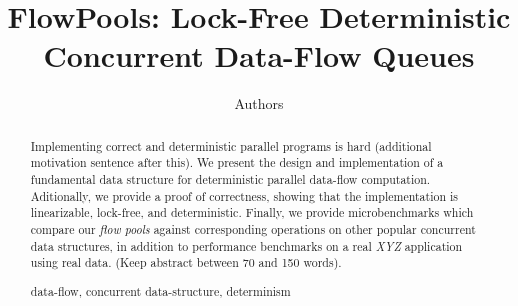 \documentclass[runningheads,a4paper]{llncs}
\newcommand{\keywords}[1]{\par\addvspace\baselineskip
\noindent\keywordname\enspace\ignorespaces#1}
\begin{document}
\mainmatter  %

\title{FlowPools: Lock-Free Deterministic Concurrent Data-Flow Queues}


%
%
\author{Authors}
%



%
%

\maketitle


\begin{abstract}
Implementing correct and deterministic parallel programs is hard (additional motivation sentence after this). We present the design and implementation of a fundamental data structure for deterministic parallel data-flow computation. Aditionally, we provide a proof of correctness, showing that the implementation is linearizable, lock-free, and deterministic. Finally, we provide microbenchmarks which compare our \emph{flow pools} against corresponding operations on other popular concurrent data structures, in addition to performance benchmarks on a real \emph{XYZ} application using real data. (Keep abstract between 70 and 150 words).
\keywords{data-flow, concurrent data-structure, determinism}
\end{abstract}
\end{document}
